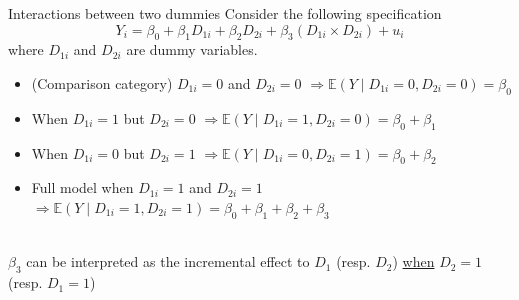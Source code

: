 \documentclass[notes,10pt, aspectratio=169]{beamer}
\begin{document}

\begin{frame}{Interactions between two dummies}
Consider the following specification
\begin{equation*}
    Y_i = \beta_0 + \beta_1 D_{1i} + \beta_2 D_{2i} + \beta_3 (D_{1i} \times D_{2i}) + u_i
\end{equation*}
where $D_{1i}$ and $D_{2i}$ are dummy variables.\\[1em]
\begin{itemize}
    \item (Comparison category) $D_{1i}=0$ and $D_{2i}=0$ $\Rightarrow \mathbb{E}(Y\mid D_{1i}=0, D_{2i}=0) = \beta_0$ 
    \item When $D_{1i}=1$ but $D_{2i}=0$ $\Rightarrow \mathbb{E}(Y\mid D_{1i}=1, D_{2i}=0) = \beta_0 + \beta_1$ 
    \item When $D_{1i}=0$ but $D_{2i}=1$ $\Rightarrow \mathbb{E}(Y\mid D_{1i}=0, D_{2i}=1) = \beta_0 + \beta_2$ 
    \item Full model when $D_{1i}=1$ and $D_{2i}=1$ $\Rightarrow \mathbb{E}(Y\mid D_{1i}=1, D_{2i}=1) = \beta_0 + \beta_1 + \beta_2 + \beta_3$ 
\end{itemize}
\\[1em]
$\beta_3$ can be interpreted as the incremental effect to $D_{1}$ (resp. $D_{2}$) \underline{when} $D_{2}=1$ (resp. $D_{1}=1$)
\end{frame}
\end{document}

